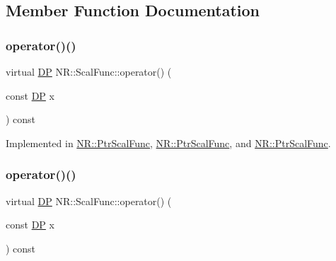 \subsection{Member Function Documentation}
\mbox{\label{classNR_1_1ScalFunc_a7dae30ac413c03bb0acfae13b7abb57e}} 
\subsubsection{\texorpdfstring{operator()()}{operator()()}\hspace{0.1cm}{\footnotesize\ttfamily [1/3]}}
{\footnotesize\ttfamily virtual \mbox{\hyperlink{namespaceNR_af6ff762dd605ff477b8e52387253a02a}{DP}} N\+R\+::\+Scal\+Func\+::operator() (\begin{DoxyParamCaption}\item[{const \mbox{\hyperlink{namespaceNR_af6ff762dd605ff477b8e52387253a02a}{DP}}}]{x }\end{DoxyParamCaption}) const\hspace{0.3cm}{\ttfamily [pure virtual]}}



Implemented in \mbox{\hyperlink{classNR_1_1PtrScalFunc_a661b2194b67e1e0e0de15389f0cea5f1}{N\+R\+::\+Ptr\+Scal\+Func}}, \mbox{\hyperlink{classNR_1_1PtrScalFunc_a661b2194b67e1e0e0de15389f0cea5f1}{N\+R\+::\+Ptr\+Scal\+Func}}, and \mbox{\hyperlink{classNR_1_1PtrScalFunc_a661b2194b67e1e0e0de15389f0cea5f1}{N\+R\+::\+Ptr\+Scal\+Func}}.

\mbox{\label{classNR_1_1ScalFunc_a7dae30ac413c03bb0acfae13b7abb57e}} 
\subsubsection{\texorpdfstring{operator()()}{operator()()}\hspace{0.1cm}{\footnotesize\ttfamily [2/3]}}
{\footnotesize\ttfamily virtual \mbox{\hyperlink{namespaceNR_af6ff762dd605ff477b8e52387253a02a}{DP}} N\+R\+::\+Scal\+Func\+::operator() (\begin{DoxyParamCaption}\item[{const \mbox{\hyperlink{namespaceNR_af6ff762dd605ff477b8e52387253a02a}{DP}}}]{x }\end{DoxyParamCaption}) const\hspace{0.3cm}{\ttfamily [pure virtual]}}



